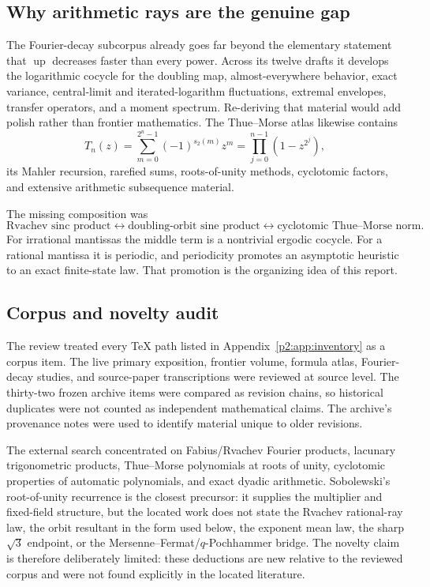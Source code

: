 \documentclass[11pt,oneside]{article}
\theoremstyle{definition}
\theoremstyle{remark}
\newcommand{\Up}{\operatorname{up}}
\newcommand{\wt}{s_2}
\begin{document}
\subsection{Why arithmetic rays are the genuine gap}

The Fourier-decay subcorpus already goes far beyond the elementary statement that
$\widehat{\Up}$ decreases faster than every power. Across its twelve drafts it
develops the logarithmic cocycle for the doubling map, almost-everywhere behavior,
exact variance, central-limit and iterated-logarithm fluctuations, extremal
envelopes, transfer operators, and a moment spectrum. Re-deriving that material
would add polish rather than frontier mathematics. The Thue--Morse atlas likewise
contains
\[
 T_n(z)=\sum_{m=0}^{2^n-1}(-1)^{\wt(m)}z^m
       =\prod_{j=0}^{n-1}(1-z^{2^j}),
\]
its Mahler recursion, rarefied sums, roots-of-unity methods, cyclotomic factors,
and extensive arithmetic subsequence material.

The missing composition was
\[
 \text{Rvachev sinc product}
 \longleftrightarrow
 \text{doubling-orbit sine product}
 \longleftrightarrow
 \text{cyclotomic Thue--Morse norm}.
\]
For irrational mantissas the middle term is a nontrivial ergodic cocycle. For a
rational mantissa it is periodic, and periodicity promotes an asymptotic heuristic
to an exact finite-state law. That promotion is the organizing idea of this report.

\subsection{Corpus and novelty audit}

The review treated every TeX path listed in Appendix~\ref{p2:app:inventory} as a corpus
item. The live primary exposition, frontier volume, formula atlas, Fourier-decay
studies, and source-paper transcriptions were reviewed at source level. The
thirty-two frozen archive items were compared as revision chains, so historical
duplicates were not counted as independent mathematical claims. The archive's
provenance notes were used to identify material unique to older revisions.

The external search concentrated on Fabius/Rvachev Fourier products, lacunary
trigonometric products, Thue--Morse polynomials at roots of unity, cyclotomic
properties of automatic polynomials, and exact dyadic arithmetic. Sobolewski's
root-of-unity recurrence is the closest precursor: it supplies the multiplier and
fixed-field structure, but the located work does not state the Rvachev rational-ray
law, the orbit resultant in the form used below, the exponent mean law, the sharp
$\sqrt3$ endpoint, or the Mersenne--Fermat/$q$-Pochhammer bridge. The novelty claim
is therefore deliberately limited: these deductions are new relative to the
reviewed corpus and were not found explicitly in the located literature.
\end{document}

